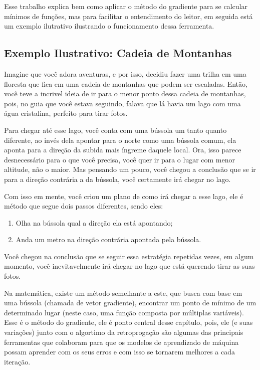 Esse trabalho explica bem como aplicar o método do gradiente para se calcular mínimos de funções, mas para facilitar o entendimento do leitor, em seguida está um exemplo ilutrativo ilustrando o funcionamento dessa ferramenta.

\subsection{Exemplo Ilustrativo: Cadeia de Montanhas}

Imagine que você adora aventuras, e por isso, decidiu fazer uma trilha em uma floresta que fica em uma cadeia de montanhas que podem ser escaladas. Então, você teve a incrivel ideia de ir para o menor ponto dessa cadeia de montanhas, pois, no guia que você estava seguindo, falava que lá havia um lago com uma água cristalina, perfeito para tirar fotos.

Para chegar até esse lago, você conta com uma bússola um tanto quanto diferente, ao invés dela apontar para o norte como uma bússola comum, ela aponta para a direção da subida mais íngreme daquele local. Ora, isso parece desnecessário para o que você precisa, você quer ir para o lugar com menor altitude, não o maior. Mas pensando um pouco, você chegou a conclusão que se ir para a direção contrária a da bússola, você certamente irá chegar no lago.

Com isso em mente, você criou um plano de como irá chegar a esse lago, ele é método que segue dois passos diferentes, sendo eles:

\begin{enumerate}
    \item Olha na bússola qual a direção ela está apontando;
    \item Anda um metro na direção contrária apontada pela bússola.
\end{enumerate}

Você chegou na conclusão que se seguir essa estratégia repetidas vezes, em algum momento, você inevitavelmente irá chegar no lago que está querendo tirar as suas fotos.

Na matemática, existe um método semelhante a este, que busca com base em uma bússola (chamada de vetor gradiente), encontrar um ponto de mínimo de um determinado lugar (neste caso, uma função composta por múltiplas variáveis). Esse é o método do gradiente, ele é ponto central desse capítulo, pois, ele (e suas variações) junto com o algortimo da retroprogação são algumas das principais ferramentas que colaboram para que os modelos de aprendizado de máquina possam aprender com os seus erros e com isso se tornarem melhores a cada iteração.

